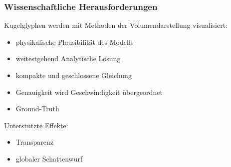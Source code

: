 \documentclass[xcolor=dvipsnames]{beamer}
\begin{document}
\begin{frame}
	\frametitle{Wissenschaftliche Herausforderungen}
	
	Kugelglyphen werden mit Methoden der Volumendarstellung visualisiert: 
	
	\begin{itemize}
		\setlength{\itemsep}{8pt}
	
		\item physikalische Plausibilität des Modells
		\item weitestgehend Analytische Lösung
		\item kompakte und geschlossene Gleichung
		\item Genauigkeit wird Geschwindigkeit übergeordnet
		\item Ground-Truth
	\end{itemize}
	
	\vspace*{0.4cm}
	
	Unterstützte Effekte:
	
	\begin{itemize}
		\item Transparenz
		\item globaler Schattenwurf
	\end{itemize}
\end{frame}
\end{document}
